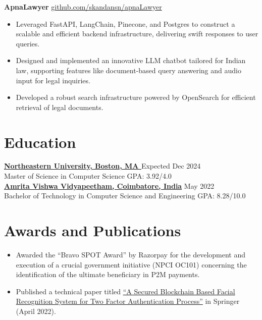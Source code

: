 \documentclass[11pt]{article}       %
\begin{document}
\textbf{ApnaLawyer} \hfill \href{https://github.com/skandansn/apnaLawyer}{github.com/skandansn/apnaLawyer} \\
\vspace{-9pt}
\begin{itemize}
  \label{projects2}

\item Leveraged FastAPI, LangChain, Pinecone, and Postgres to construct a scalable and efficient backend infrastructure, delivering swift responses to user queries.\item Designed and implemented an innovative LLM chatbot tailored for Indian law, supporting features like document-based query answering and audio input for legal inquiries.\item Developed a robust search infrastructure powered by OpenSearch for efficient retrieval of legal documents.\end{itemize}

\vspace{-18.5pt}

\section*{Education}
\textbf{\href{https://www.northeastern.edu/}{Northeastern University, Boston, MA }} \hfill Expected Dec 2024 \\
Master of Science in Computer Science \hfill GPA: 3.92/4.0 \\

\textbf{\href{https://www.amrita.edu/}{Amrita Vishwa Vidyapeetham, Coimbatore, India}} \hfill May 2022 \\
Bachelor of Technology in Computer Science and Engineering \hfill GPA: 8.28/10.0 \\

\section*{Awards and Publications}
\begin{itemize}
  \item Awarded the ``Bravo SPOT Award'' by Razorpay for the development and execution of a crucial government initiative (NPCI OC101) concerning the identification of the ultimate beneficiary in P2M payments.
  \item Published a technical paper titled \href{https://link.springer.com/chapter/10.1007/978-981-19-1677-9_44}{``A Secured Blockchain Based Facial Recognition System for Two Factor Authentication Process''} in Springer (April 2022).  
\end{itemize}
\end{document}
